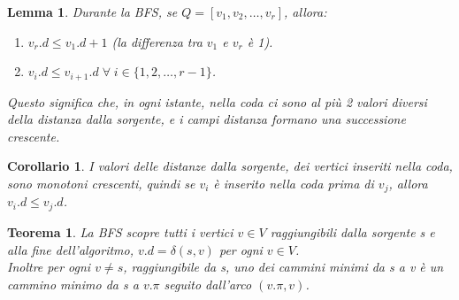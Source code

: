 \documentclass{article}
\newtheorem{theorem}{Teorema}[section]
\newtheorem{lemma}{Lemma}[section]
\newtheorem{corollary}{Corollario}[section]
\begin{document}
\begin{lemma}
    Durante la BFS, se $Q = [v_1, v_2, \dots, v_r]$, allora:
    \begin{enumerate}
        \item $v_r.d \leq v_1.d + 1$ (la differenza tra $v_1$ e $v_r$ è 1).
        \item $v_i.d \leq v_{i + 1}.d \; \forall \; i \in \{1, 2, \dots, r - 1\}$.
    \end{enumerate}
    Questo significa che, in ogni istante, nella coda ci sono al più 2 valori diversi della distanza dalla sorgente, e i campi distanza formano una successione crescente.
\end{lemma}

\begin{corollary}
    I valori delle distanze dalla sorgente, dei vertici inseriti nella coda, sono monotoni crescenti, quindi se $v_i$ è inserito nella coda prima di $v_j$, allora $v_i.d \leq v_j.d$.
\end{corollary}

\begin{theorem}
    La BFS scopre tutti i vertici $v \in V$ raggiungibili dalla sorgente s e alla fine dell'algoritmo, 
    $v.d = \delta(s, v)$ per ogni $v \in V$. \\
    Inoltre per ogni $v \neq s$, raggiungibile da s, uno dei cammini minimi da s a v è un cammino minimo da s a $v.\pi$ seguito dall'arco $(v.\pi, v)$.
\end{theorem}
\end{document}
